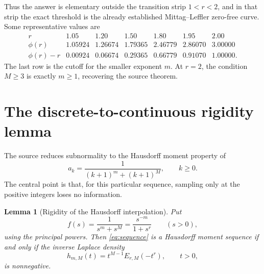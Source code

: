 \documentclass[11pt]{article}
\newtheorem{lemma}{Lemma}
\begin{document}
Thus the answer is elementary outside the transition strip $1<r<2$, and in
that strip the exact threshold is the already established Mittag--Leffler
zero-free curve.  Some representative values are
\[
\begin{array}{c|rrrrrr}
r&1.05&1.20&1.50&1.80&1.95&2.00\\ \hline
\phi(r)&1.05924&1.26674&1.79365&2.46779&2.86070&3.00000\\
\phi(r)-r&0.00924&0.06674&0.29365&0.66779&0.91070&1.00000.
\end{array}
\]
The last row is the cutoff for the smaller exponent $m$.  At $r=2$, the
condition $M\geq3$ is exactly $m\geq1$, recovering the source theorem.

\section{The discrete-to-continuous rigidity lemma}

The source reduces subnormality to the Hausdorff moment property of
\begin{equation}\label{eq:sequence}
 a_k=\frac{1}{(k+1)^m+(k+1)^M},\qquad k\geq0.
\end{equation}
The central point is that, for this particular sequence, sampling only at the
positive integers loses no information.

\begin{lemma}[Rigidity of the Hausdorff interpolation]\label{lem:rigidity}
Put
\[
 f(s)=\frac{1}{s^m+s^M}=\frac{s^{-m}}{1+s^r}\qquad(s>0),
\]
using the principal powers.  Then \eqref{eq:sequence} is a Hausdorff moment
sequence if and only if the inverse Laplace density
\begin{equation}\label{eq:density}
 h_{m,M}(t)=t^{M-1}E_{r,M}(-t^r),\qquad t>0,
\end{equation}
is nonnegative.
\end{lemma}
\end{document}

